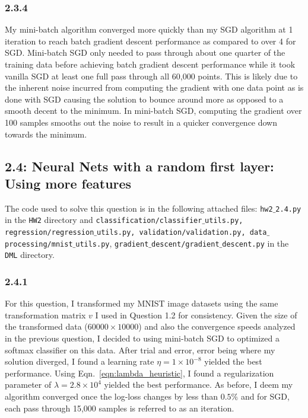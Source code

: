 \documentclass[12pt]{amsart}
\begin{document}
\subsubsection*{2.3.4}

My mini-batch algorithm converged more quickly than my SGD algorithm at 1 iteration to reach batch gradient descent performance as compared to over 4 for SGD.  Mini-batch SGD only needed to pass through about one quarter of the training data before achieving batch gradient descent performance while it took vanilla SGD at least one full pass through all 60,000 points.  This is likely due to the inherent noise incurred from computing the gradient with one data point as is done with SGD causing the solution to bounce around more as opposed to a smooth decent to the minimum.  In mini-batch SGD, computing the gradient over 100 samples smooths out the noise to result in a quicker convergence down towards the minimum.

\subsection*{2.4: Neural Nets with a random first layer: Using more features}

The code used to solve this question is in the following attached files: {\tt hw2$\_$2.4.py} in the {\tt HW2} directory and {\tt classification/classifier$\_$utils.py, regression/regression$\_$utils.py, validation/validation.py, data$\_$processing/mnist$\_$utils.py}, 
{\tt gradient$\_$descent/gradient$\_$descent.py} in the {\tt DML} directory.

\subsubsection*{2.4.1}

For this question, I transformed my MNIST image datasets using the same transformation matrix $v$ I used in Question 1.2 for consistency.  Given the size of the transformed data ($60000 \times 10000$) and also the convergence speeds analyzed in the previous question, I decided to using mini-batch SGD to optimized a softmax classifier on this data.  After trial and error, error being where my solution diverged, I found a learning rate $\eta = 1 \times 10^{-8}$ yielded the best performance.  Using Eqn.~\ref{eqn:lambda_heuristic}, I found a regularization parameter of $\lambda = 2.8 \times 10^{4}$ yielded the best performance.  As before, I deem my algorithm converged once the log-loss changes by less than $0.5\%$ and for SGD, each pass through 15,000 samples is referred to as an iteration.
\end{document}
